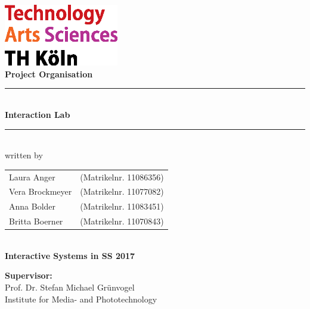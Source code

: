 \thispagestyle{empty}
\begin{center}
			\includegraphics[width=5cm]{Bilder/logo_TH}\\[12ex]
			{\Huge\textbf{Project Organisation}}\\[8ex]
			\rule{.8\textwidth}{.2pt}
			{\Large\\[1ex] \textbf{Interaction Lab}}\\
			\rule{.8\textwidth}{.2pt}\\[10ex]
			written by\\[2ex]
			\begin{tabular}{ll}
			Laura Anger &(Matrikelnr. 11086356)\\ 
			Vera Brockmeyer &(Matrikelnr. 11077082)\\
			Anna Bolder &(Matrikelnr. 11083451)\\
			Britta Boerner &(Matrikelnr. 11070843)\\
			\end{tabular}\\[10ex]
			\textbf{Interactive Systems in SS 2017}\\			
			\end{center}
			\vfill
			\begin{flushleft}
			{\bf Supervisor:}\\
			Prof. Dr. Stefan Michael Grünvogel\\
			Institute for Media- and Phototechnology
			\end{flushleft}
	\newpage